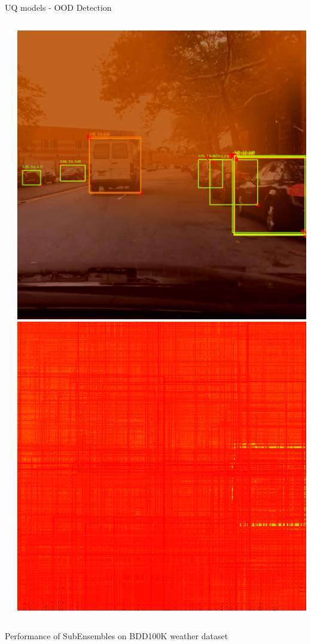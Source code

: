 \documentclass[10pt, aspectratio=169]{beamer}
\begin{document}
\begin{frame}[allowframebreaks]{UQ models - OOD Detection}
\begin{columns}
\begin{column}{.2\textwidth}
            \end{column}
            \begin{column}{.2\textwidth}
                \includegraphics[width=\textwidth]{images/uq_weathers/SubEns_Variance4.png}
                \includegraphics[width=\textwidth]{images/uq_weathers/SubEns_entropies_all4.png}
            \end{column}
        \end{columns}
        \begin{center}
            Performance of SubEnsembles on BDD100K weather dataset
        \end{center}
      


\end{frame}
\end{document}
